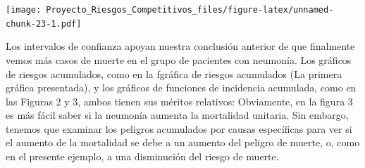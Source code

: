 \documentclass[
]{article}
\begin{document}
\texttt{[image: Proyecto\_Riesgos\_Competitivos\_files/figure-latex/unnamed-chunk-23-1.pdf]}

Los intervalos de confianza apoyan nuestra conclusión anterior de que
finalmente vemos más casos de muerte en el grupo de pacientes con
neumonía. Los gráficos de riesgos acumulados, como en la fgráfica de
riesgos acumulados (La primera gráfica presentada), y los gráficos de
funciones de incidencia acumulada, como en las Figuras 2 y 3, ambos
tienen sus méritos relativos: Obviamente, en la figura 3 es más fácil
saber si la neumonía aumenta la mortalidad unitaria. Sin embargo,
tenemos que examinar los peligros acumulados por causas específicas para
ver si el aumento de la mortalidad se debe a un aumento del peligro de
muerte, o, como en el presente ejemplo, a una disminución del riesgo de
muerte.
\end{document}
